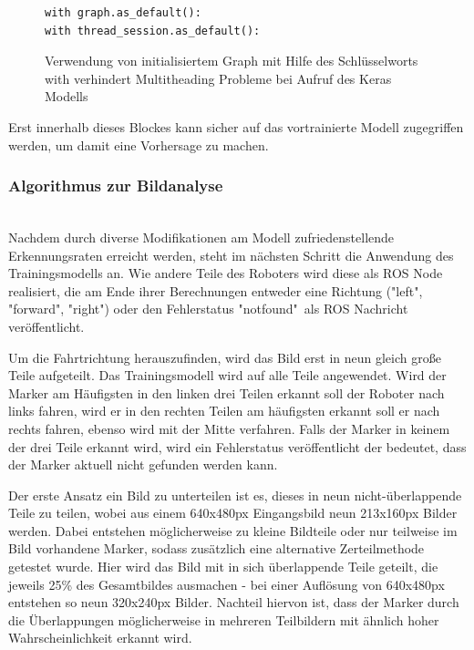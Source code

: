 \documentclass[conference]{IEEEtran}
\begin{document}
	\begin{figure}
		\centering
		\begin{verbatim}
with graph.as_default():
with thread_session.as_default():
		\end{verbatim}
		\label{with}
		\caption{Verwendung von initialisiertem Graph mit Hilfe des 
		Schlüsselworts with verhindert Multitheading Probleme bei Aufruf des 
		Keras Modells}
	\end{figure}
		
	Erst innerhalb dieses Blockes kann sicher auf das vortrainierte Modell zugegriffen werden, um damit eine Vorhersage zu machen.
	\subsubsection{Algorithmus zur Bildanalyse }
	\noindent \\
Nachdem durch diverse Modifikationen am Modell zufriedenstellende 
Erkennungsraten erreicht werden, steht im nächsten Schritt die Anwendung 
des Trainingsmodells an.
Wie andere Teile des Roboters wird diese als ROS Node realisiert, die am Ende ihrer Berechnungen entweder eine Richtung ("left", "forward", "right") oder den Fehlerstatus "notfound"\ als ROS Nachricht veröffentlicht.

Um die Fahrtrichtung herauszufinden, wird das Bild erst in neun gleich 
gro{\ss}e Teile aufgeteilt. Das Trainingsmodell wird auf alle Teile 
angewendet.
Wird der Marker am Häufigsten in den linken drei Teilen erkannt soll der 
Roboter nach links fahren, wird er in den rechten Teilen am häufigsten 
erkannt soll er nach rechts fahren, ebenso wird mit der Mitte verfahren.
Falls der Marker in keinem der drei Teile erkannt wird, wird ein Fehlerstatus veröffentlicht der bedeutet, dass der Marker aktuell nicht gefunden werden kann.

Der erste Ansatz ein Bild zu unterteilen ist es, dieses in neun nicht-überlappende Teile zu teilen, wobei aus einem 640x480px Eingangsbild neun 213x160px Bilder werden. 
Dabei entstehen möglicherweise zu kleine Bildteile oder nur teilweise im 
Bild vorhandene Marker, sodass zusätzlich eine alternative Zerteilmethode 
getestet wurde. 
Hier wird das Bild mit in sich überlappende Teile geteilt, die jeweils 25\% des Gesamtbildes ausmachen - bei einer Auflösung von 640x480px entstehen so neun 320x240px Bilder.
Nachteil hiervon ist, dass der Marker durch die Überlappungen möglicherweise in mehreren Teilbildern mit ähnlich hoher Wahrscheinlichkeit erkannt wird.
\end{document}
